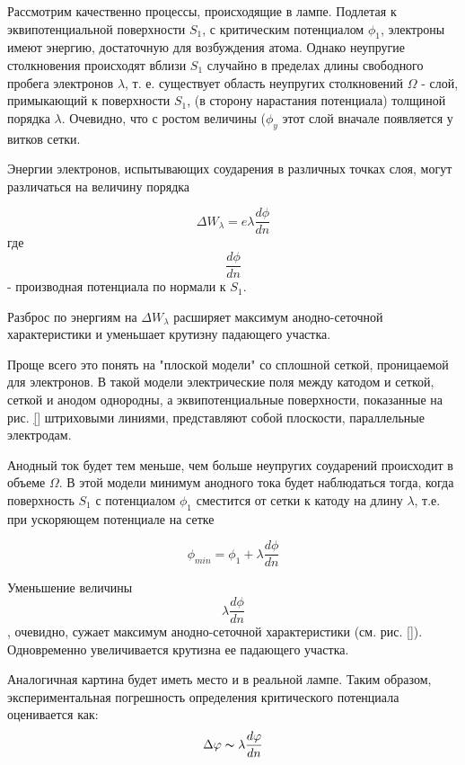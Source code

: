 Рассмотрим качественно процессы, происходящие в лампе. Подлетая к эквипотенциальной поверхности $S_1$, с критическим потенциалом $\phi_1$, электроны имеют энергию, достаточную для возбуждения атома. Однако неупругие столкновения происходят вблизи $S_1$ случайно в пределах длины свободного пробега электронов $\lambda$, т. е. существует область неупругих столкновений $\Omega$ - слой, примыкающий к поверхности $S_1$, (в сторону нарастания потенциала) толщиной порядка $\lambda$. Очевидно, что с ростом величины ($\phi_y$ этот слой вначале появляется у витков сетки.

Энергии электронов, испытывающих соударения в различных точках слоя, могут различаться на величину порядка

\begin{equation*}
	\Delta W_{\lambda} = e \lambda \frac{d\phi}{dn}
\end{equation*}
где \[\frac{d\phi}{dn}\] - производная потенциала по нормали к $S_1$.

Разброс по энергиям на $\Delta W_\lambda$ расширяет максимум анодно-сеточной характеристики и уменьшает крутизну падающего участка.

Проще всего это понять на "плоской модели" со сплошной сеткой, проницаемой для электронов. В такой модели электрические поля между катодом и сеткой, сеткой и анодом однородны, а эквипотенциальные поверхности, показанные на рис. \ref{} штриховыми линиями, представляют собой плоскости, параллельные электродам.

Анодный ток будет тем меньше, чем больше неупругих соударений происходит в объеме $\Omega$. В этой модели минимум анодного тока будет наблюдаться тогда, когда поверхность $S_1$ с потенциалом $\phi_1$ сместится от сетки к катоду на длину $\lambda$, т.е. при ускоряющем потенциале на сетке

\begin{equation*}
	\phi_{min}=\phi_1+\lambda\frac{d\phi}{dn}
\end{equation*}

Уменьшение величины \[\lambda\frac{d\phi}{dn}\], очевидно, сужает максимум анодно-сеточной характеристики (см. рис. \ref{}). Одновременно увеличивается крутизна ее падающего участка.

Аналогичная картина будет иметь место и в реальной лампе. Таким образом, экспериментальная погрешность определения критического потенциала оценивается как:
\begin{equation*}
	\Delta \phi \thicksim \lambda \frac{d\phi}{dn}
\end{equation*}

